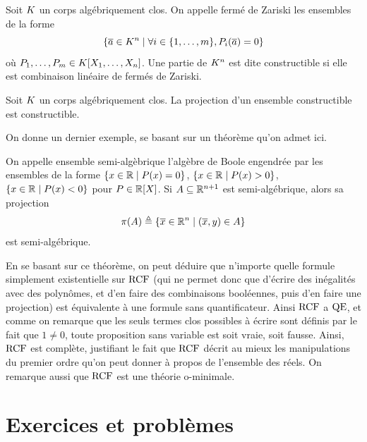 \begin{definition}
  Soit $K$ un corps algébriquement clos. On appelle fermé de Zariski les
  ensembles de la forme
  \[\left\{ \overline{a} \in K^n \;\middle\vert\; \forall i \in \{1,\ldots,m\},P_i(\overline{a}) = 0 \right\}\]
  où $P_1,\ldots,P_m\in K[X_1,\ldots,X_n]$. Une partie de $K^n$ est
  dite constructible si elle est combinaison linéaire de fermés de Zariski.
\end{definition}

\begin{corollary}
  Soit $K$ un corps algébriquement clos. La projection d'un ensemble
  constructible est constructible.
\end{corollary}

\noindent
On donne un dernier exemple, se basant sur un théorème qu'on admet ici.

\begin{theorem}
  On appelle ensemble semi-algèbrique l'algèbre de Boole engendrée par les
  ensembles de la forme
  $\left\{ x\in\mathbb R \;\middle\vert\; P(x)=0 \right\}$, $\left\{ x\in\mathbb R \;\middle\vert\; P(x)>0 \right\}$,
  $\left\{ x\in\mathbb R \;\middle\vert\; P(x)<0 \right\}$
  pour $P\in\mathbb R[X]$. Si $A\subseteq\mathbb R^{n+1}$ est semi-algébrique, alors
  sa projection
  \[\pi(A) \triangleq \left\{ \overline{x}\in\mathbb R^n \;\middle\vert\; (\overline{x},y)\in A \right\}\]
  est semi-algébrique.
\end{theorem}

\begin{example}
  En se basant sur ce théorème, on peut déduire que n'importe quelle formule
  simplement existentielle sur $\operatorname{RCF}$ (qui ne permet donc que d'écrire des
  inégalités avec des polynômes, et d'en faire des combinaisons booléennes, puis
  d'en faire une projection)
  est équivalente à une formule sans quantificateur. Ainsi $\operatorname{RCF}$ a $\operatorname{QE}$, et
  comme on remarque que les seuls termes clos possibles à écrire sont définis
  par le fait que $1\neq 0$, toute proposition sans variable est soit vraie,
  soit fausse. Ainsi, $\operatorname{RCF}$ est complète, justifiant le fait que $\operatorname{RCF}$ décrit
  au mieux les manipulations du premier ordre qu'on peut donner à propos de
  l'ensemble des réels. On remarque aussi que $\operatorname{RCF}$ est une théorie o-minimale.
\end{example}

\clearpage

\section{Exercices et problèmes}

